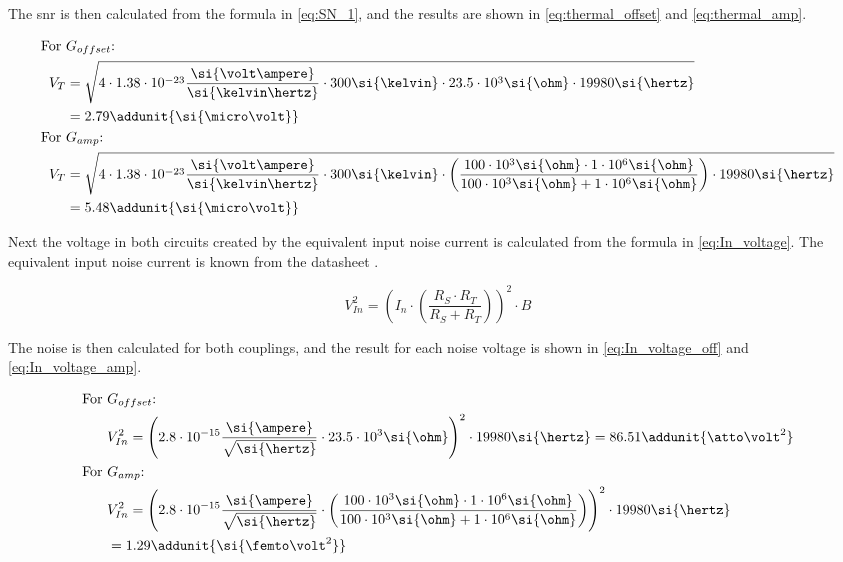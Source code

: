 The \gls{snr} is then calculated from the formula in \autoref{eq:SN_1}, and the results are shown in \autoref{eq:thermal_offset} and \autoref{eq:thermal_amp}.

\begin{align}
	\text{For } &G_{offset}\text{: } \nonumber \\ 
	V_T &= \sqrt{4 \cdot 1.38 \cdot 10^{-23} \frac{\si{\volt\ampere}}{\si{\kelvin\hertz}} \cdot 300 \si{\kelvin} \cdot 23.5 \cdot 10^3 \si{\ohm} \cdot 19980\si{\hertz}} \nonumber\\
	&= 2.79 \addunit{\si{\micro\volt}} \label{eq:thermal_offset} \\
	\text{For } &G_{amp}\text{: } \nonumber\\ 
	V_T &= \sqrt{4 \cdot 1.38 \cdot 10^{-23}\frac{\si{\volt\ampere}}{\si{\kelvin\hertz}} \cdot 300\si{\kelvin} \cdot \left( \frac{100 \cdot10^{3}\si{\ohm} \cdot 1 \cdot 10^6\si{\ohm} }{100 \cdot10^{3}\si{\ohm} + 1 \cdot 10^6\si{\ohm}} \right) \cdot 19980\si{\hertz}} \nonumber\\
	&= 5.48 \addunit{\si{\micro\volt}} \label{eq:thermal_amp}
\end{align}

Next the voltage in both circuits created by the equivalent input noise current is calculated from the formula in \autoref{eq:In_voltage}. The equivalent input noise current is known from the datasheet \citep{tle2072ac}.


\begin{equation} \label{eq:In_voltage}
	V_{In}^2 = \left( I_n \cdot \left( \frac{R_S \cdot R_T }{R_S + R_T} \right) \right)^2 \cdot B
\end{equation}

\startexplain
\stopexplain

The noise is then calculated for both couplings, and the result for each noise voltage is shown in \autoref{eq:In_voltage_off} and \autoref{eq:In_voltage_amp}. 

\begin{align}
	\text{For } &G_{offset}\text{: } \nonumber\\
	&V_{In}^2 = \left( 2.8 \cdot 10^{-15}\frac {\si{\ampere}}{\sqrt{\si{\hertz}}} \cdot 23.5 \cdot 10^3\si{\ohm} \right) ^2 \cdot 19980\si{\hertz} = 86.51 \addunit{\atto\volt^2} \label{eq:In_voltage_off}\\
	\text{For } &G_{amp}\text{: } \nonumber\\
	&V_{In}^2 = \left( 2.8 \cdot 10^{-15}\frac {\si{\ampere}}{\sqrt{\si{\hertz}}} \cdot \left( \frac{100 \cdot10^{3}\si{\ohm} \cdot 1 \cdot 10^6 \si{\ohm}}{100 \cdot10^{3}\si{\ohm} + 1 \cdot 10^6\si{\ohm}} \right) \right) ^2 \cdot 19980\si{\hertz} \nonumber \\
	 &= 1.29 \label{eq:In_voltage_amp} 
	\addunit{\si{\femto\volt^2}}
\end{align}

